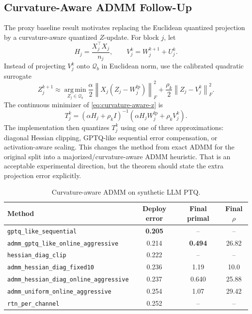 \documentclass[11pt]{article}
\newcommand{\argmin}{\operatorname*{arg\,min}}
\newcommand{\norm}[1]{\left\lVert #1 \right\rVert}
\newcommand{\Q}{\mathcal{Q}}
\begin{document}
\subsection{Curvature-Aware ADMM Follow-Up}

The proxy baseline result motivates replacing the Euclidean quantized
projection by a curvature-aware quantized \(Z\)-update.  For block \(j\), let
\[
    H_j=\frac{X_j^\top X_j}{n_j},
    \qquad
    V_j^k=W_j^{k+1}+U_j^k.
\]
Instead of projecting \(V_j^k\) onto \(\Q_b\) in Euclidean norm, use the
calibrated quadratic surrogate
\begin{equation}
    Z_j^{k+1}
    \approx
    \argmin_{Z_j\in\Q_b}
    \frac{\alpha}{2}
    \norm{X_j(Z_j-W_j^{\mathrm{fp}})}_F^2
    +
    \frac{\rho_k}{2}
    \norm{Z_j-V_j^k}_F^2.
    \label{eq:curvature-aware-z}
\end{equation}
The continuous minimizer of \eqref{eq:curvature-aware-z} is
\begin{equation}
    T_j^k
    =
    (\alpha H_j+\rho_k I)^{-1}
    (\alpha H_j W_j^{\mathrm{fp}}+\rho_k V_j^k).
    \label{eq:curvature-aware-target}
\end{equation}
The implementation then quantizes \(T_j^k\) using one of three approximations:
diagonal Hessian clipping, GPTQ-like sequential error compensation, or
activation-aware scaling.  This changes the method from exact ADMM for the
original split into a majorized/curvature-aware ADMM heuristic.  That is an
acceptable experimental direction, but the theorem should state the extra
projection error explicitly.

\begin{table}[h]
\centering
\caption{Curvature-aware ADMM on synthetic LLM PTQ.}
\label{tab:curvature-admm}
\begin{tabular}{lccc}
\toprule
Method & Deploy error & Final primal & Final \(\rho\)\\
\midrule
\texttt{gptq\_like\_sequential} & \textbf{0.205} & -- & --\\
\texttt{admm\_gptq\_like\_online\_aggressive} & 0.214 & \textbf{0.494} & 26.82\\
\texttt{hessian\_diag\_clip} & 0.222 & -- & --\\
\texttt{admm\_hessian\_diag\_fixed10} & 0.236 & 1.19 & 10.0\\
\texttt{admm\_hessian\_diag\_online\_aggressive} & 0.237 & 0.640 & 25.88\\
\texttt{admm\_uniform\_online\_aggressive} & 0.254 & 1.07 & 29.42\\
\texttt{rtn\_per\_channel} & 0.252 & -- & --\\
\bottomrule
\end{tabular}
\end{table}
\end{document}
